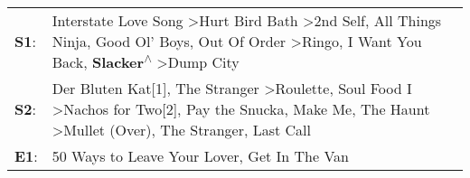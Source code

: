 \begin{supertabular}{p{0.03\textwidth}p{0.92\textwidth}}
 \textbf{S1}:  &            Interstate Love Song\textsuperscript{} \textgreater \enspace Hurt Bird Bath\textsuperscript{} \textgreater \enspace 2nd Self\textsuperscript{}, \enspace All Things Ninja\textsuperscript{}, \enspace Good Ol' Boys\textsuperscript{}, \enspace Out Of Order\textsuperscript{} \textgreater \enspace Ringo\textsuperscript{}, \enspace I Want You Back\textsuperscript{}, \enspace \textbf{Slacker\textsuperscript{$\wedge$}} \textgreater \enspace Dump City\textsuperscript{}  \enspace  \\
 \textbf{S2}:  &  Der Bluten Kat[1]\textsuperscript{}, \enspace The Stranger\textsuperscript{} \textgreater \enspace Roulette\textsuperscript{}, \enspace Soul Food I\textsuperscript{} \textgreater \enspace Nachos for Two[2]\textsuperscript{}, \enspace Pay the Snucka\textsuperscript{}, \enspace Make Me\textsuperscript{}, \enspace The Haunt\textsuperscript{} \textgreater \enspace Mullet (Over)\textsuperscript{}, \enspace The Stranger\textsuperscript{}, \enspace Last Call\textsuperscript{}  \enspace  \\
 \textbf{E1}:  &                                                                                                                                                                                                                                                                                                                                                                                                   50 Ways to Leave Your Lover\textsuperscript{}, \enspace Get In The Van\textsuperscript{}  \enspace  \\
\end{supertabular}
